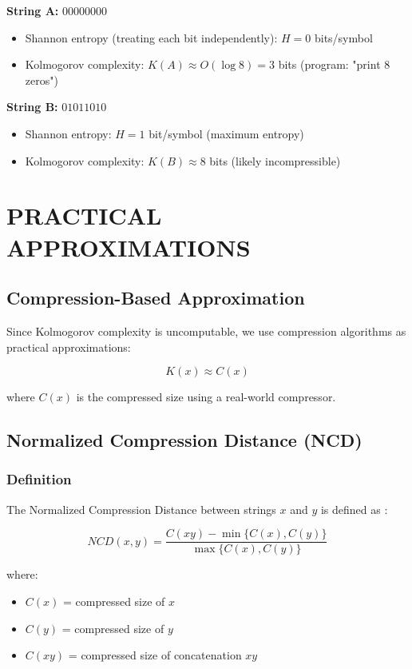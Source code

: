 \documentclass[12pt,a4paper]{report}
\begin{document}
\textbf{String A:} $00000000$
\begin{itemize}
    \item Shannon entropy (treating each bit independently): $H = 0$ bits/symbol
    \item Kolmogorov complexity: $K(A) \approx O(\log 8) = 3$ bits (program: "print 8 zeros")
\end{itemize}

\textbf{String B:} $01011010$
\begin{itemize}
    \item Shannon entropy: $H = 1$ bit/symbol (maximum entropy)
    \item Kolmogorov complexity: $K(B) \approx 8$ bits (likely incompressible)
\end{itemize}

\chapter{PRACTICAL APPROXIMATIONS}

\section{Compression-Based Approximation}

Since Kolmogorov complexity is uncomputable, we use compression algorithms as practical approximations:

\begin{equation}
K(x) \approx C(x)
\end{equation}

where $C(x)$ is the compressed size using a real-world compressor.

\section{Normalized Compression Distance (NCD)}

\subsection{Definition}

The Normalized Compression Distance between strings $x$ and $y$ is defined as \cite{cilibrasi2005clustering}:

\begin{equation}
NCD(x, y) = \frac{C(xy) - \min\{C(x), C(y)\}}{\max\{C(x), C(y)\}}
\end{equation}

where:
\begin{itemize}
    \item $C(x)$ = compressed size of $x$
    \item $C(y)$ = compressed size of $y$
    \item $C(xy)$ = compressed size of concatenation $xy$
\end{itemize}
\end{document}

